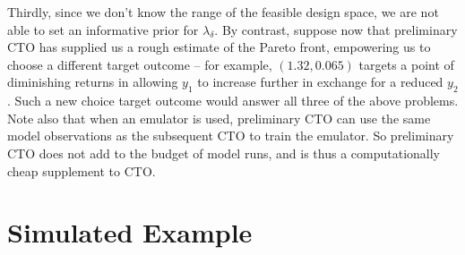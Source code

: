 \documentclass[12pt]{article}
\begin{document}
%
Thirdly, since we don't know the range of the feasible design space, we are not able to set an informative prior for $\lambda_\delta$.
%
By contrast, suppose now that preliminary CTO has supplied us a rough estimate of the Pareto front, empowering us to choose a different target outcome -- for example, $(1.32,0.065)$ targets a point of diminishing returns in allowing $y_1$ to increase further in exchange for a reduced $y_2$.
%
%
Such a new choice target outcome would answer all three of the above problems.
%
%
%
%
Note also that when an emulator is used, preliminary CTO can use the same model observations as the subsequent CTO to train the emulator.
%
So preliminary CTO does not add to the budget of model runs, and is thus a computationally cheap supplement to CTO.
%

%
\section{Simulated Example}\label{example}
%
\end{document}
